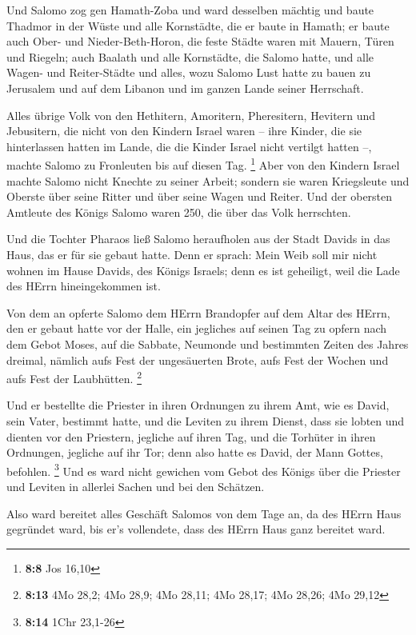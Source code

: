  Und Salomo zog gen Hamath-Zoba und ward desselben mächtig
 und baute Thadmor in der Wüste und alle Kornstädte, die er
baute in Hamath;  er baute auch Ober- und Nieder-Beth-Horon,
die feste Städte waren mit Mauern, Türen und Riegeln;  auch
Baalath und alle Kornstädte, die Salomo hatte, und alle Wagen- und
Reiter-Städte und alles, wozu Salomo Lust hatte zu bauen zu Jerusalem
und auf dem Libanon und im ganzen Lande seiner Herrschaft.

 Alles übrige Volk von den Hethitern, Amoritern,
Pheresitern, Hevitern und Jebusitern, die nicht von den Kindern Israel
waren --  ihre Kinder, die sie hinterlassen hatten im Lande,
die die Kinder Israel nicht vertilgt hatten --, machte Salomo zu
Fronleuten bis auf diesen Tag. \footnote{\textbf{8:8} Jos 16,10}
 Aber von den Kindern Israel machte Salomo nicht Knechte zu
seiner Arbeit; sondern sie waren Kriegsleute und Oberste über seine
Ritter und über seine Wagen und Reiter.  Und der obersten
Amtleute des Königs Salomo waren 250, die über das Volk herrschten.

 Und die Tochter Pharaos ließ Salomo heraufholen aus der
Stadt Davids in das Haus, das er für sie gebaut hatte. Denn er sprach:
Mein Weib soll mir nicht wohnen im Hause Davids, des Königs Israels;
denn es ist geheiligt, weil die Lade des HErrn hineingekommen ist.

 Von dem an opferte Salomo dem HErrn Brandopfer auf dem
Altar des HErrn, den er gebaut hatte vor der Halle,  ein
jegliches auf seinen Tag zu opfern nach dem Gebot Moses, auf die
Sabbate, Neumonde und bestimmten Zeiten des Jahres dreimal, nämlich aufs
Fest der ungesäuerten Brote, aufs Fest der Wochen und aufs Fest der
Laubhütten. \footnote{\textbf{8:13} 4Mo 28,2; 4Mo 28,9; 4Mo 28,11; 4Mo
  28,17; 4Mo 28,26; 4Mo 29,12}

 Und er bestellte die Priester in ihren Ordnungen zu ihrem
Amt, wie es David, sein Vater, bestimmt hatte, und die Leviten zu ihrem
Dienst, dass sie lobten und dienten vor den Priestern, jegliche auf
ihren Tag, und die Torhüter in ihren Ordnungen, jegliche auf ihr Tor;
denn also hatte es David, der Mann Gottes, befohlen. \footnote{\textbf{8:14}
  1Chr 23,1-26}  Und es ward nicht gewichen vom Gebot des
Königs über die Priester und Leviten in allerlei Sachen und bei den
Schätzen.

 Also ward bereitet alles Geschäft Salomos von dem Tage an,
da des HErrn Haus gegründet ward, bis er's vollendete, dass des HErrn
Haus ganz bereitet ward.


